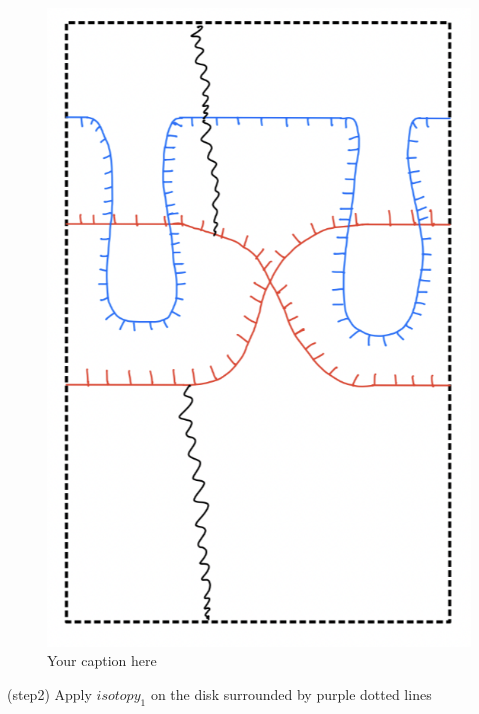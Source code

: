 \begin{figure}[H] %
    \centering
    \includegraphics[scale = 0.95]{diagrams/lemma10/4.png} %
    \caption{Your caption here}
    \label{fig:your-label}
\end{figure}

(step2) Apply $isotopy_1$ on the disk surrounded by purple dotted lines

